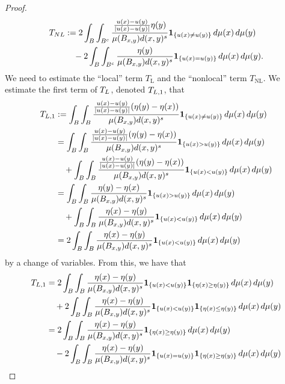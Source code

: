 \documentclass[10pt,a4paper]{amsart}
\begin{document}
\begin{proof}
{\begin{align*}
				T_{\rm NL} &:= 2\int_{B}\int_{B^c} \frac{\frac{u(x)-u(y)}{|u(x)-u(y)|} \eta(y) }{\mu(B_{x,y}) d(x,y)^s} {\bf 1}_{\{ u(x)\neq u(y)\}}\,d\mu(x)\,d\mu(y)\\
				& \quad -2\int_{B} \int_{B^c} \frac{ \eta(y) }{\mu(B_{x,y}) d(x,y)^s} {\bf 1}_{\{u(x)=u(y)\}}\,d\mu(x)\,d\mu(y).
			\end{align*}
		}
		We need to estimate the ``local'' term $T_{\mathrm{L}}$ and the ``nonlocal''
		term $T_{\mathrm{NL}}$.  
		{We  estimate the first term of $T_{\rm L}$, denoted $T_{\rm L,1}$, that} 
		\begin{align*}
			T_{\rm L, 1} & := \int_B\int_B\frac{\frac{u(x)-u(y)}{|u(x)-u(y)|} (\eta(y)-\eta(x)) }{\mu(B_{x,y}) d(x,y)^s} {\bf 1}_{\{ u(x)\neq  u(y)\}} \,d\mu(x)\,d\mu(y) \\
			&=\int_B\int_B\frac{\frac{u(x)-u(y)}{|u(x)-u(y)|} (\eta(y)-\eta(x)) }{\mu(B_{x,y}) d(x,y)^s} {\bf 1}_{\{ u(x)> u(y)\}} \,d\mu(x)\,d\mu(y)  \notag \\
			&\quad +\int_B\int_B\frac{\frac{u(x)-u(y)}{|u(x)-u(y)|} (\eta(y)-\eta(x)) }{\mu(B_{x,y}) d(x,y)^s} {\bf 1}_{\{ u(x)< u(y)\}} \,d\mu(x)\,d\mu(y) \notag  \\
			&=  \int_B\int_B\frac{\eta(y)-\eta(x) }{\mu(B_{x,y}) d(x,y)^s} {\bf 1}_{\{ u(x)> u(y)\}} \,d\mu(x)\,d\mu(y)  \notag \\
			&\quad +\int_B\int_B\frac{ \eta(x)-\eta(y) }{\mu(B_{x,y}) d(x,y)^s} {\bf 1}_{\{ u(x)< u(y)\}} \,d\mu(x)\,d\mu(y)\notag \\
			&= 2  \int_B\int_B \frac{\eta(x)-\eta(y) }{\mu(B_{x,y}) d(x,y)^s} {\bf 1}_{\{ u(x)< u(y)\}} \,d\mu(x)\,d\mu(y)\notag 
		\end{align*}
		by a change of variables. From this, we have that
		\begin{align}
			T_{\rm L,1}
			&= 2  \int_B\int_B \frac{\eta(x)-\eta(y) }{\mu(B_{x,y}) d(x,y)^s} {\bf 1}_{\{ u(x)< u(y)\}} {\bf 1}_{\{\eta(x)\geq \eta(y)\}} \,d\mu(x)\,d\mu(y)\notag \\
			&\quad + 2  \int_B\int_B \frac{\eta(x)-\eta(y) }{\mu(B_{x,y}) d(x,y)^s} {\bf 1}_{\{ u(x)< u(y)\}} {\bf 1}_{\{\eta(x)\leq \eta(y)\}} \,d\mu(x)\,d\mu(y)\notag \\
			&=  2\int_B\int_B \frac{\eta(x)-\eta(y) }{\mu(B_{x,y}) d(x,y)^s} {\bf 1}_{\{ \eta(x)\geq \eta(y)\}} \,d\mu(x)\,d\mu(y)\notag \\ 
			&\quad - 2  \int_B\int_B \frac{\eta(x)-\eta(y) }{\mu(B_{x,y}) d(x,y)^s} {\bf 1}_{\{ u(x)= u(y)\}} {\bf 1}_{\{\eta(x)\geq \eta(y)\}} \,d\mu(x)\,d\mu(y) \notag \\

\end{align}
\end{proof}
\end{document}
